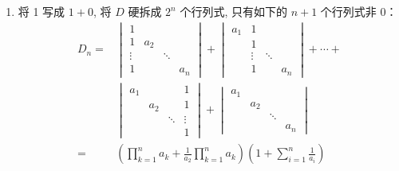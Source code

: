 \begin{enumerate}
\begin{enumerate}
              \item 将 1 写成 $1+0$, 将 $D$ 硬拆成 $2^{n}$ 个行列式, 只有如下的 $n+1$ 个行列式非 0：
                    \begin{align*}
                        D_n = & \begin{vmatrix}
                                    1      &       &        &       \\
                                    1      & a_{2} &        &       \\
                                    \vdots &       & \ddots &       \\
                                    1      &       &        & a_{n}
                                \end{vmatrix}
                        +\begin{vmatrix}
                             a_{1} & 1      &                \\
                                   & 1      &                \\
                                   & \vdots & \ddots &       \\
                                   & 1      &        & a_{n}
                         \end{vmatrix}+\cdots+                    \\
                              & \begin{vmatrix}
                                    a_{1} &       &        & 1      \\
                                          & a_{2} &        & 1      \\
                                          &       & \ddots & \vdots \\
                                          &       &        & 1
                                \end{vmatrix}
                        +\begin{vmatrix}
                             a_{1} &                      \\
                                   & a_{2} &              \\
                                   &       & \ddots &     \\
                                   &       &        & a_n
                         \end{vmatrix}                       \\
                        =     & \left(\prod_{k=1}^{n} a_{k}+\frac{1}{a_{2}}
                        \prod_{k=1}^{n} a_{k}\right)\left(1+\sum_{i=1}^{n} \frac{1}{a_{i}}\right)
                    \end{align*}
          \end{enumerate}


\end{enumerate}
